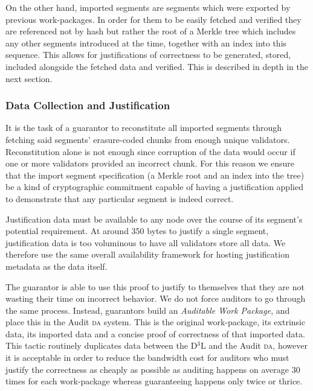 On the other hand, imported segments are segments which were exported by previous work-packages. In order for them to be easily fetched and verified they are referenced not by hash but rather the root of a Merkle tree which includes any other segments introduced at the time, together with an index into this sequence. This allows for justifications of correctness to be generated, stored, included alongside the fetched data and verified. This is described in depth in the next section.

\subsubsection{Data Collection and Justification}


It is the task of a guarantor to reconstitute all imported segments through fetching said segments' erasure-coded chunks from enough unique validators. Reconstitution alone is not enough since corruption of the data would occur if one or more validators provided an incorrect chunk. For this reason we ensure that the import segment specification (a Merkle root and an index into the tree) be a kind of cryptographic commitment capable of having a justification applied to demonstrate that any particular segment is indeed correct.

Justification data must be available to any node over the course of its segment's potential requirement. At around 350 bytes to justify a single segment, justification data is too voluminous to have all validators store all data. We therefore use the same overall availability framework for hosting justification metadata as the data itself.

The guarantor is able to use this proof to justify to themselves that they are not wasting their time on incorrect behavior. We do not force auditors to go through the same process. Instead, guarantors build an \emph{Auditable Work Package}, and place this in the Audit \textsc{da} system. This is the original work-package, its extrinsic data, its imported data and a concise proof of correctness of that imported data. This tactic routinely duplicates data between the D$^3$L and the Audit \textsc{da}, however it is acceptable in order to reduce the bandwidth cost for auditors who must justify the correctness as cheaply as possible as auditing happens on average 30 times for each work-package whereas guaranteeing happens only twice or thrice.

